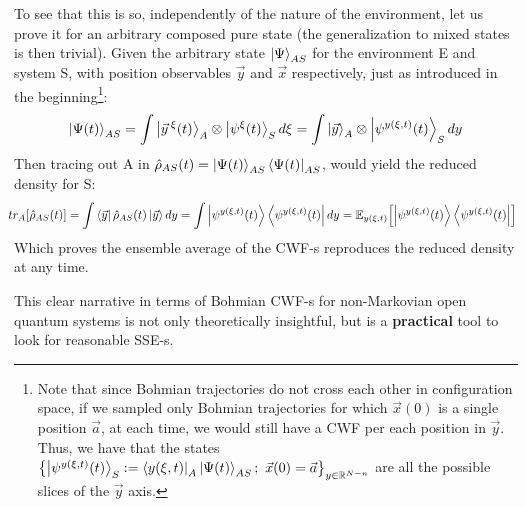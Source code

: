 \documentclass[11pt, a4paper]{article} %
\newcommand{\R}{\mathbb{R}} %
\begin{document}
To see that this is so, independently of the nature of the environment, let us prove it for an arbitrary composed pure state (the generalization to mixed states is then trivial). Given the arbitrary state $\ket{\Psi}_{AS}$ for the environment E and system S, with position observables $\vec{y}$ and $\vec{x}$ respectively, just as introduced in the beginning\footnote{Note that since Bohmian trajectories do not cross each other in configuration space, if we sampled only Bohmian trajectories for which $\vec{x}(0)$ is a single position $\vec{a}$, at each time, we would still have a CWF per each position in $\vec{y}$. Thus, we have that the states $\qty{\ket{\psi^{y(\xi,t)}(t)}_S:=\bra{y(\xi,t)}_A\ket{\Psi(t)}_{AS};\ \vec{x}(0)=\vec{a}}_{y\in\R^{N-n}}$ are all the possible slices of the $\vec{y}$ axis.}:\vspace{-0.2cm}
\begin{equation}
\ket{\Psi(t)}_{AS}=\int\ket{\vec{y}^{\:\xi}(t)}_A\otimes \ket{\psi^\xi(t)}_S d\xi = \int\ket{\vec{y}}_A\otimes \ket{\psi^{y(\xi,t)}(t)}_S dy
\end{equation}
Then tracing out A in $\hat{\rho}_{AS}(t)=\ket{\Psi(t)}_{AS}\bra{\Psi(t)}_{AS}$, would yield the reduced density for S:
\begin{equation}\hspace{-0.2cm}
tr_A\qty[\hat{\rho}_{AS}(t)] = \int\bra{\vec{y}}\hat{\rho}_{AS}(t)\ket{\vec{y}}dy = \int \ket{\psi^{y(\xi,t)}(t)}\bra{\psi^{y(\xi,t)}(t)} dy = \mathbb{E}_{y(\xi,t)}\qty[\ket{\psi^{y(\xi,t)}(t)}\bra{\psi^{y(\xi,t)}(t)}]
\end{equation}
Which proves the ensemble average of the CWF-s reproduces the reduced density at any time.\vspace{-0.15cm}

This clear narrative in terms of Bohmian CWF-s for non-Markovian open quantum systems is not only theoretically insightful, but is a {\bf practical} tool to look for reasonable SSE-s. \vspace{-0.2cm}
\end{document}
